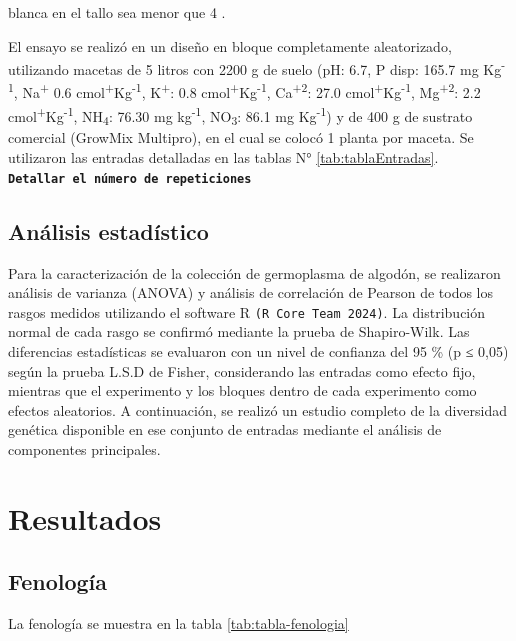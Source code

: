 \documentclass[12pt,oneside]{reedthesis}
\begin{document}
blanca en el tallo sea menor que 4 \autocite{bourland1992}.

El ensayo se realizó en un diseño en bloque completamente aleatorizado, utilizando macetas de 5 litros con 2200 g de suelo (pH: 6.7, P disp: 165.7 mg Kg\textsuperscript{-1}, Na\textsuperscript{+} 0.6 cmol\textsuperscript{+}Kg\textsuperscript{-1}, K\textsuperscript{+}: 0.8 cmol\textsuperscript{+}Kg\textsuperscript{-1}, Ca\textsuperscript{+2}: 27.0 cmol\textsuperscript{+}Kg\textsuperscript{-1}, Mg\textsuperscript{+2}: 2.2 cmol\textsuperscript{+}Kg\textsuperscript{-1}, NH\textsubscript{4}: 76.30 mg kg\textsuperscript{-1}, NO\textsubscript{3}: 86.1 mg Kg\textsuperscript{-1}) y de 400 g de sustrato comercial (GrowMix Multipro), en el cual se colocó 1 planta por maceta. Se utilizaron las entradas detalladas en las tablas N° \ref{tab:tablaEntradas}. \textbf{\texttt{Detallar\ el\ número\ de\ repeticiones}}

\subsection{Análisis estadístico}\label{anuxe1lisis-estaduxedstico}

Para la caracterización de la colección de germoplasma de algodón, se realizaron análisis de varianza (ANOVA) y análisis de correlación de Pearson de todos los rasgos medidos utilizando el software R \texttt{(R\ Core\ Team\ 2024)}. La distribución normal de cada rasgo se confirmó mediante la prueba de Shapiro-Wilk. Las diferencias estadísticas se evaluaron con un nivel de confianza del 95 \% (p ≤ 0,05) según la prueba L.S.D de Fisher, considerando las entradas como efecto fijo, mientras que el experimento y los bloques dentro de cada experimento como efectos aleatorios. A continuación, se realizó un estudio completo de la diversidad genética disponible en ese conjunto de entradas mediante el análisis de componentes principales.

\section{Resultados}\label{resultados}

\subsection{Fenología}\label{fenologuxeda}

La fenología se muestra en la tabla \ref{tab:tabla-fenologia}
\end{document}
